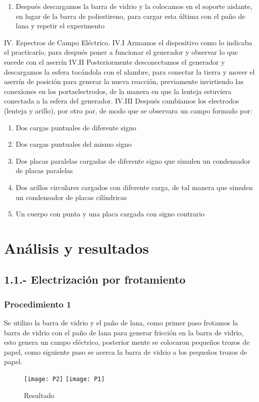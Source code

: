 \documentclass[14pt]{article}
\begin{document}
\begin{multicols}{2}
\begin{enumerate}
	\item Después descargamos la barra de vidrio y la colocamos en el soporte aislante, en lugar de la barra de poliestireno, para cargar esta última con el paño de lana y repetir el experimento   
\end{enumerate}
IV. Espectros de Campo Eléctrico. 
IV.I Armamos el dispositivo como lo indicaba el practicarío, para después poner a funcionar el generador y observar lo que sucede con el aserrín 
IV.II Posteriormente desconectamos el generador y descargamos la esfera tocándola con el alambre, para conectar la tierra y mover el aserrín de posición para generar la nueva reacción, previamente invirtiendo las conexiones en los portaelectrodos, de la manera en que la lenteja estuviera conectada a la esfera del generador. 
IV.III Después cambiamos los electrodos (lenteja y arillo), por otro par, de modo que se observara un campo formado por: 
\begin{enumerate}
	\item Dos cargas puntuales de diferente signo 
	\item Dos cargas puntuales del mismo signo 
	\item Dos placas paralelas cargadas de diferente signo que simulen un condensador de placas paralelas 
	\item Dos arillos circulares cargados con diferente carga, de tal manera que simulen un condensador de placas cilíndricas 
	\item Un cuerpo con punta y una placa cargada con signo contrario 
\end{enumerate}
\section{Análisis y resultados}
\subsection*{1.1.- Electrización por frotamiento}
\subsubsection*{Procedimiento 1}
Se utilizo la barra de vidrio y el paño de lana, como primer paso frotamos la barra de vidrio con el paño de lana para generar fricción en la barra de vidrio, esto genera un campo eléctrico, posterior mente se colocaron pequeños trozos de papel, como siguiente paso se acerca la barra de vidrio a los pequeños trozos de papel.

\begin{figure}[h]
\centering
\texttt{[image: P2]}
\texttt{[image: P1]}
\caption{Resultado}
\end{figure}


\end{multicols}
\end{document}
